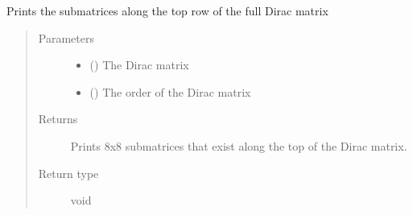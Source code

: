 \documentclass[letterpaper,10pt,english]{sphinxmanual}
\begin{document}
\begin{fulllineitems}
\label{\detokenize{index:su2.showMr}}
Prints the submatrices along the top row of the full Dirac
matrix
\begin{quote}\begin{description}
\item[{Parameters}] \leavevmode\begin{itemize}
\item {} 
 () \textendash{} The Dirac matrix

\item {} 
 () \textendash{} The order of the Dirac matrix

\end{itemize}

\item[{Returns}] \leavevmode
Prints 8x8 submatrices that exist along the top of the Dirac
matrix.

\item[{Return type}] \leavevmode
void

\end{description}\end{quote}

\end{fulllineitems}

\end{document}
